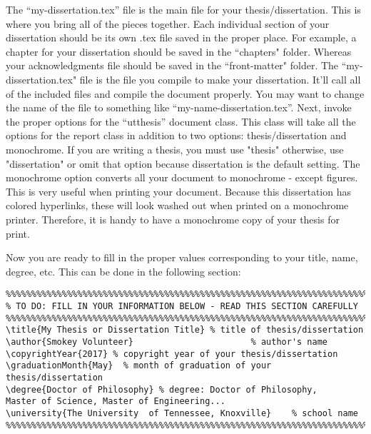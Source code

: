 The ``my-dissertation.tex'' file is the main file for your thesis/dissertation. This is where you bring all of the pieces together. Each individual section of your dissertation should be its own .tex file saved in the proper place. For example, a chapter for your dissertation should be saved in the ``chapters" folder. Whereas your acknowledgments file should be saved in the ``front-matter" folder. The ``my-dissertation.tex" file is the file you compile to make your dissertation. It'll call all of the included files and compile the document properly. You may want to change the name of the file to something like ``my-name-dissertation.tex''. Next, invoke the proper options for the ``utthesis'' document class. This class will take all the options for the report class in addition to two options: thesis/dissertation and monochrome. If you are writing a thesis, you must use "thesis" otherwise, use "dissertation" or omit that option because dissertation is the default setting. The monochrome option converts all your document to monochrome - except figures. This is very useful when printing your document. Because this dissertation has colored hyperlinks, these will look washed out when printed on a monochrome printer. Therefore, it is handy to have a monochrome copy of your thesis for print. 

Now you are ready to fill in the proper values corresponding to your title, name, degree, etc. This can be done in the following section:
\begin{verbatim}
%%%%%%%%%%%%%%%%%%%%%%%%%%%%%%%%%%%%%%%%%%%%%%%%%%%%%%%%%%%%%%%%%%%%%%%%%%%
% TO DO: FILL IN YOUR INFORMATION BELOW - READ THIS SECTION CAREFULLY
%%%%%%%%%%%%%%%%%%%%%%%%%%%%%%%%%%%%%%%%%%%%%%%%%%%%%%%%%%%%%%%%%%%%%%%%%%%
\title{My Thesis or Dissertation Title}	% title of thesis/dissertation
\author{Smokey Volunteer}                		% author's name
\copyrightYear{2017} % copyright year of your thesis/dissertation
\graduationMonth{May}  % month of graduation of your thesis/dissertation
\degree{Doctor of Philosophy} % degree: Doctor of Philosophy, 
Master of Science, Master of Engineering...
\university{The University  of Tennessee, Knoxville}	% school name
%%%%%%%%%%%%%%%%%%%%%%%%%%%%%%%%%%%%%%%%%%%%%%%%%%%%%%%%%%%%%%%%%%%%%%%%%%%
\end{verbatim}

